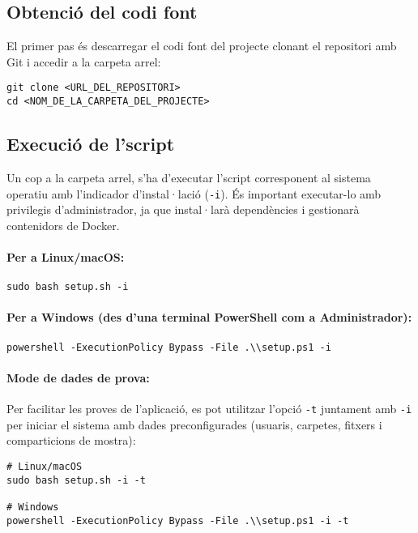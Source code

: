 \subsection{Obtenció del codi font}
El primer pas és descarregar el codi font del projecte clonant el repositori amb Git i accedir a la carpeta arrel:
\begin{verbatim}
git clone <URL_DEL_REPOSITORI>
cd <NOM_DE_LA_CARPETA_DEL_PROJECTE>
\end{verbatim}

\subsection{Execució de l'script}
Un cop a la carpeta arrel, s'ha d'executar l'script corresponent al sistema operatiu amb l'indicador d'instal·lació (\texttt{-i}). És important executar-lo amb privilegis d'administrador, ja que instal·larà dependències i gestionarà contenidors de Docker.

\paragraph{Per a Linux/macOS:}
\begin{verbatim}
sudo bash setup.sh -i
\end{verbatim}

\paragraph{Per a Windows (des d'una terminal PowerShell com a Administrador):}
\begin{verbatim}
powershell -ExecutionPolicy Bypass -File .\\setup.ps1 -i
\end{verbatim}

\paragraph{Mode de dades de prova:}
Per facilitar les proves de l'aplicació, es pot utilitzar l'opció \texttt{-t} juntament amb \texttt{-i} per iniciar el sistema amb dades preconfigurades (usuaris, carpetes, fitxers i comparticions de mostra):

\begin{verbatim}
# Linux/macOS
sudo bash setup.sh -i -t

# Windows
powershell -ExecutionPolicy Bypass -File .\\setup.ps1 -i -t
\end{verbatim}


